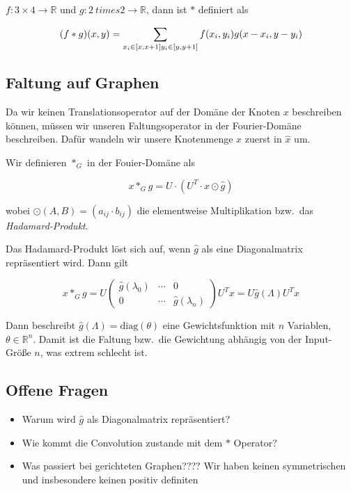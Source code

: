 $f: 3 \times 4 \rightarrow \mathbb{R}$ und $g: 2 \ times 2 \rightarrow \mathbb{R}$, dann ist $*$ definiert als

\begin{equation}
  (f * g)(x, y) = \sum_{x_i \in [x, x+1]\\y_i \in [y, y+1]} f(x_i, y_i)g(x-x_i, y-y_i)
\end{equation}

\subsection{Faltung auf Graphen}

Da wir keinen Translationsoperator auf der Domäne der Knoten $x$ beschreiben können, müssen wir unseren Faltungsoperator in der Fourier-Domäne beschreiben.
Dafür wandeln wir unsere Knotenmenge $x$ zuerst in $\hat x$ um.

Wir definieren $*_G$ in der Fouier-Domäne als

\begin{equation}
  x *_G g = U \cdot (U^T \cdot x \odot \hat g)
\end{equation}

wobei $\odot(A, B) = (a_{ij} \cdot b_{ij})$ die elementweise Multiplikation bzw.\ das \emph{Hadamard-Produkt}.

Das Hadamard-Produkt löst sich auf, wenn $\hat g$ als eine Diagonalmatrix repräsentiert wird. Dann gilt

\begin{equation}
  x *_G g = U \begin{pmatrix}
    \hat g(\lambda_0) & \cdots & 0\\
    0 & \cdots & \hat g(\lambda_n)
  \end{pmatrix}U^T x = U \hat g(\Lambda) U^T x
\end{equation}

Dann beschreibt $\hat g(\Lambda) = \text{diag}(\theta)$ eine Gewichtsfunktion mit $n$ Variablen, $\theta \in \mathbb{R}^n$.
Damit ist die Faltung bzw.\ die Gewichtung abhängig von der Input-Größe $n$, was extrem schlecht ist.

\subsection{Offene Fragen}

\begin{itemize}
  \item Warum wird $\hat g$ als Diagonalmatrix repräsentiert?
  \item Wie kommt die Convolution zustande mit dem $*$ Operator?
  \item Was passiert bei gerichteten Graphen???? Wir haben keinen symmetrischen und insbesondere keinen positiv definiten
\end{itemize}

